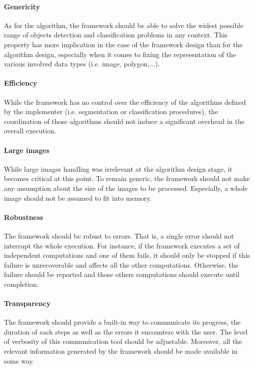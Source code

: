 \paragraph{Genericity} As for the algorithm, the framework should be able to solve the widest possible range of objects detection and classification problems in any context. This property has more implication in the case of the framework design than for the algorithm design, especially when it comes to fixing the representation of the various involved data types (i.e. image, polygon,...).

\paragraph{Efficiency} While the framework has no control over the efficiency of the algorithms defined by the implementer (i.e. segmentation or classification procedures), the coordination of those algorithms should not induce a significant overhead in the overall execution. 

\paragraph{Large images} While large images handling was irrelevant at the algorithm design stage, it becomes critical at this point. To remain generic, the framework should not make any assumption about the size of the images to be processed. Especially, a whole image should not be assumed to fit into memory.

\paragraph{Robustness} The framework should be robust to errors. That is, a single error should not interrupt the whole execution. For instance, if the framework executes a set of independent computations and one of them fails, it should only be stopped if this failure is unrecoverable and affects all the other computations. Otherwise, the failure should be reported and those others computations should execute until completion. 

\paragraph{Transparency} The framework should provide a built-in way to communicate its progress, the duration of each steps as well as the errors it encounters with the user. The level of verbosity of this communication tool should be adjustable. Moreover, all the relevant information generated by the framework should be made available in some way.

